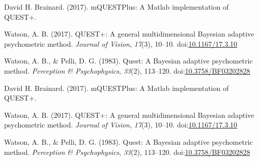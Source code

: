 \documentclass[
  man,floatsintext]{apa6}
\newlength{\cslhangindent}
\newenvironment{cslreferences}%
  {\setlength{\parindent}{0pt}%
  \everypar{\setlength{\hangindent}{\cslhangindent}}\ignorespaces}%
  {\par}
\begin{document}
\hypertarget{refs}{}
\begin{cslreferences}
\leavevmode\hypertarget{ref-davidh.brainardMQUESTPlusMatlabImplementation2017}{}%
David H. Brainard. (2017). mQUESTPlus: A Matlab implementation of QUEST+.

\leavevmode\hypertarget{ref-watsonQUESTGeneralMultidimensional2017}{}%
Watson, A. B. (2017). QUEST+: A general multidimensional Bayesian adaptive psychometric method. \emph{Journal of Vision}, \emph{17}(3), 10--10. doi:\href{https://doi.org/10.1167/17.3.10}{10.1167/17.3.10}

\leavevmode\hypertarget{ref-watsonQuestBayesianAdaptive1983}{}%
Watson, A. B., \& Pelli, D. G. (1983). Quest: A Bayesian adaptive psychometric method. \emph{Perception \& Psychophysics}, \emph{33}(2), 113--120. doi:\href{https://doi.org/10.3758/BF03202828}{10.3758/BF03202828}

\leavevmode\hypertarget{ref-davidh.brainardMQUESTPlusMatlabImplementation2017}{}%
David H. Brainard. (2017). mQUESTPlus: A Matlab implementation of QUEST+.

\leavevmode\hypertarget{ref-watsonQUESTGeneralMultidimensional2017}{}%
Watson, A. B. (2017). QUEST+: A general multidimensional Bayesian adaptive psychometric method. \emph{Journal of Vision}, \emph{17}(3), 10--10. doi:\href{https://doi.org/10.1167/17.3.10}{10.1167/17.3.10}

\leavevmode\hypertarget{ref-watsonQuestBayesianAdaptive1983}{}%
Watson, A. B., \& Pelli, D. G. (1983). Quest: A Bayesian adaptive psychometric method. \emph{Perception \& Psychophysics}, \emph{33}(2), 113--120. doi:\href{https://doi.org/10.3758/BF03202828}{10.3758/BF03202828}
\end{cslreferences}

\endgroup
\end{document}
